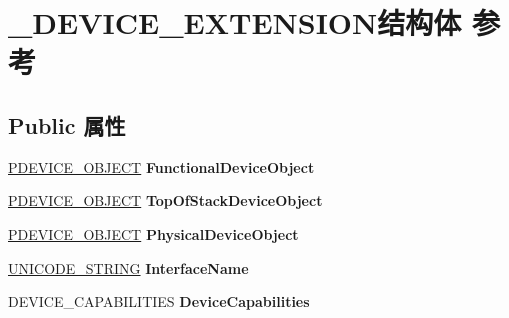 \hypertarget{struct___d_e_v_i_c_e___e_x_t_e_n_s_i_o_n}{}\section{\+\_\+\+D\+E\+V\+I\+C\+E\+\_\+\+E\+X\+T\+E\+N\+S\+I\+O\+N结构体 参考}
\label{struct___d_e_v_i_c_e___e_x_t_e_n_s_i_o_n}
\subsection*{Public 属性}
\begin{DoxyCompactItemize}
\item 
\mbox{\label{struct___d_e_v_i_c_e___e_x_t_e_n_s_i_o_n_a007b9ffe33cbb8352caa900e354541a6}} 
\hyperlink{struct___d_e_v_i_c_e___o_b_j_e_c_t}{P\+D\+E\+V\+I\+C\+E\+\_\+\+O\+B\+J\+E\+CT} {\bfseries Functional\+Device\+Object}
\item 
\mbox{\label{struct___d_e_v_i_c_e___e_x_t_e_n_s_i_o_n_a3255e2b19e3346a8dc7eb78f54fecf9b}} 
\hyperlink{struct___d_e_v_i_c_e___o_b_j_e_c_t}{P\+D\+E\+V\+I\+C\+E\+\_\+\+O\+B\+J\+E\+CT} {\bfseries Top\+Of\+Stack\+Device\+Object}
\item 
\mbox{\label{struct___d_e_v_i_c_e___e_x_t_e_n_s_i_o_n_ab982ad8ed7465117668ff5227c3b0167}} 
\hyperlink{struct___d_e_v_i_c_e___o_b_j_e_c_t}{P\+D\+E\+V\+I\+C\+E\+\_\+\+O\+B\+J\+E\+CT} {\bfseries Physical\+Device\+Object}
\item 
\mbox{\label{struct___d_e_v_i_c_e___e_x_t_e_n_s_i_o_n_ac158ed4ee143fde68ebef18fec441e64}} 
\hyperlink{struct___u_n_i_c_o_d_e___s_t_r_i_n_g}{U\+N\+I\+C\+O\+D\+E\+\_\+\+S\+T\+R\+I\+NG} {\bfseries Interface\+Name}
\item 
\mbox{\label{struct___d_e_v_i_c_e___e_x_t_e_n_s_i_o_n_a4424d613b073052c013ded2bc30fb462}} 
D\+E\+V\+I\+C\+E\+\_\+\+C\+A\+P\+A\+B\+I\+L\+I\+T\+I\+ES {\bfseries Device\+Capabilities}
\item 
\mbox{\label{struct___d_e_v_i_c_e___e_x_t_e_n_s_i_o_n_ae79b6ed2db6cb2c721c293b41825b385}} 

\end{DoxyCompactItemize}
